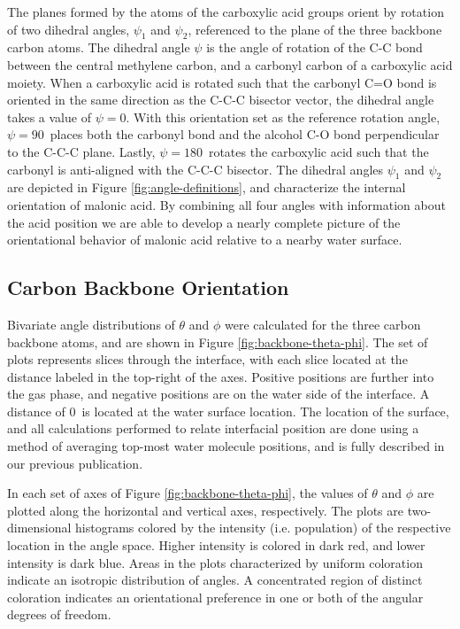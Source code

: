 The planes formed by the atoms of the carboxylic acid groups orient by rotation of two dihedral angles, $\psi_1$ and $\psi_2$, referenced to the plane of the three backbone carbon atoms. The dihedral angle $\psi$ is the angle of rotation of the C-C bond between the central methylene carbon, and a carbonyl carbon of a carboxylic acid moiety. When a carboxylic acid is rotated such that the carbonyl C=O bond is oriented in the same direction as the C-C-C bisector vector, the dihedral angle takes a value of $\psi=0$\textdegree. With this orientation set as the reference rotation angle, $\psi=90$\textdegree~places both the carbonyl bond and the alcohol C-O bond perpendicular to the C-C-C plane. Lastly, $\psi=180$\textdegree~rotates the carboxylic acid such that the carbonyl is anti-aligned with the C-C-C bisector. The dihedral angles $\psi_1$ and $\psi_2$ are depicted in Figure \ref{fig:angle-definitions}, and characterize the internal orientation of malonic acid. By combining all four angles with information about the acid position we are able to develop a nearly complete picture of the orientational behavior of malonic acid relative to a nearby water surface.



\subsection {Carbon Backbone Orientation}

Bivariate angle distributions of $\theta$ and $\phi$ were calculated for the three carbon backbone atoms, and are shown in Figure \ref{fig:backbone-theta-phi}. The set of plots represents slices through the interface, with each slice located at the distance labeled in the top-right of the axes. Positive positions are further into the gas phase, and negative positions are on the water side of the interface. A distance of 0\angs~is located at the water surface location. The location of the surface, and all calculations performed to relate interfacial position are done using a method of averaging top-most water molecule positions, and is fully described in our previous publication.\cite{Shamay2011}

In each set of axes of Figure \ref{fig:backbone-theta-phi}, the values of $\theta$ and $\phi$ are plotted along the horizontal and vertical axes, respectively. The plots are two-dimensional histograms colored by the intensity (i.e. population) of the respective location in the angle space. Higher intensity is colored in dark red, and lower intensity is dark blue. Areas in the plots characterized by uniform coloration indicate an isotropic distribution of angles. A concentrated region of distinct coloration indicates an orientational preference in one or both of the angular degrees of freedom.

